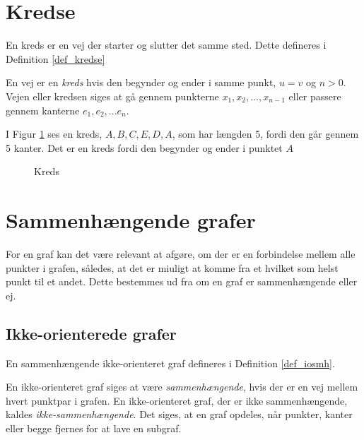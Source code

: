 \section{Kredse}
En kreds er en vej der starter og slutter det samme sted.
Dette defineres i Definition \ref{def_kredse}

\begin{defn}
\label{def_kredse}
En vej er en \textit{kreds} hvis den begynder og ender i samme punkt, $u=v$ og $n>0$.
Vejen eller kredsen siges at gå gennem punkterne $x_1,x_2,...,x_{n-1}$ eller passere gennem kanterne $e_1, e_2,...e_n$.
\end{defn}

\begin{exmp}
I Figur \ref{graf_kreds} ses en kreds, $A,B,C,E,D,A$, som har længden 5, fordi den går gennem 5 kanter. Det er en kreds fordi den begynder og ender i punktet $A$
\end{exmp}

\begin{figure}[h]
\centering
{}
\caption{Kreds} 
\label{graf_kreds}
\end{figure}

\section{Sammenhængende grafer}
For en graf kan det være relevant at afgøre, om der er en forbindelse mellem alle punkter i grafen, således, at det er miuligt at komme fra et hvilket som helst punkt til et andet.
Dette bestemmes ud fra om en graf er sammenhængende eller ej.

\subsection{Ikke-orienterede grafer}
En sammenhængende ikke-orienteret graf defineres i Definition \ref{def_iosmh}.

\begin{defn}
\label{def_iosmh}
En ikke-orienteret graf siges at være \textit{sammenhængende}, hvis der er en vej mellem hvert punktpar i grafen. 
En ikke-orienteret graf, der er ikke sammenhængende, kaldes \textit{ikke-sammenhængende}.
Det siges, at en graf opdeles, når punkter, kanter eller begge fjernes for at lave en subgraf. 
\end{defn}

